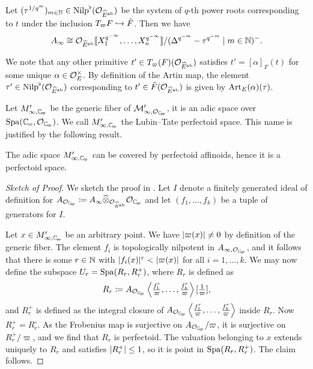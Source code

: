 \documentclass[../main.tex]{subfiles}
\begin{document}
\begin{cor}\label{cor:StructureOfAinfty}
  Let $(\tau^{1/q^m})_{m \in \mathbb{N}} \in {\mathrm{Nilp}}^\flat(\mathcal{O}_{\widehat E^{\mathrm{ab}}})$ be the
  system of $q$-th power roots corresponding to $t$ under the inclusion
  $T_\varpi F \hookrightarrow \tilde F$. Then we have 
  \begin{equation*}
    A_\infty \cong \mathcal{O}_{\widehat E^{\mathrm{ab}}}\llbracket X_1^{q^{-\infty}}, \dots,
    X_n^{q^{-\infty}}\rrbracket/(\Delta^{q^{-m}} - \tau^{q^{-m}} \mid m \in \mathbb{N})^-.
  \end{equation*}
\end{cor}

We note that any other primitive $t' \in T_\varpi(F)(\mathcal{O}_{\widehat E^{\mathrm{ab}}})$ satisfies
$t' = [\alpha]_F(t)$ for some unique $\alpha \in \mathcal{O}_E^\times$. 
By definition of the Artin map, the element $\tau' \in {\mathrm{Nilp}}^\flat(\mathcal{O}_{\widehat
E^{\mathrm{ab}}})$ corresponding to $t' \in \tilde F(\mathcal{O}_{\widehat E^{\mathrm{ab}}})$ is given by
$\mathrm{Art}_E(\alpha)(\tau)$.

Let $M'_{\infty, \Cp}$ be the generic fiber of $\cM'_{\infty,\cO_\Cp}$, it 
is an adic space over $\spa(\Cp, \cO_\Cp)$. We call $M'_{\infty, \Cp}$ the 
Lubin--Tate perfectoid space. This name is justified by the following result.
\begin{thm}\label{thm:LTPerfSpace}
  The adic space $M'_{\infty, \Cp}$ can be covered by perfectoid affinoids,
  hence it is a perfectoid space.
  \begin{proof}[Sketch of Proof] 
    We sketch the proof in \cite[Lemma 2.32]{weinstein2016semistable}. 
    Let $I$ denote a finitely generated ideal of definition for $A_{\cO_\Cp}
    \coloneqq A_\infty \cotimes_{\cO_{\hat E^\ab}} \cO_\Cp$ and let $(f_1,
    \dots, f_k)$ be a tuple of generators for $I$. 

    Let $x \in M'_{\infty, \Cp}$ be an arbitrary point. We have
    $\lvert \varpi(x) \rvert \neq 0$ by definition of the generic fiber. The element
    $f_i$ is topologically nilpotent in $A_{\infty,\cO_\Cp}$,
    and it follows that there is some $r \in \mathbb{N}$ with $\lvert f_i(x) \rvert^r <
    \lvert \varpi(x) \rvert$ for all $i = 1, \dots, k$. We may now define the subspace 
    $U_r = \operatorname{Spa}(R_r, R_r^+)$, where $R_r$ is defined as
    $$R_r \coloneqq A_{\cO_\Cp}\left\langle \tfrac{f_1^r}\varpi, \dots, \tfrac
    {f_k^r}\varpi \right\rangle [\tfrac 1\varpi],$$
    and $R_r^+$ is defined as the integral closure of $A_{\cO_\Cp}\left\langle
    \tfrac{f_1^r}\varpi, \dots, \tfrac {f_k^r}\varpi \right\rangle$ inside
    $R_r$. Now $R_r^+ = R_r^\circ$. As the Frobenius map is surjective on
    $A_{\cO_\Cp}/\varpi$, it is surjective on $R_r^+/\varpi$, and we find
    that $R_r$ is perfectoid. The valuation
    belonging to $x$ extends uniquely to $R_r$ and satisfies $\lvert R_r^+ \rvert \leq 1$,
    so it is point in $\operatorname{Spa}(R_r, R_r^+)$. The claim follows.
  \end{proof}
\end{thm}
\end{document}
